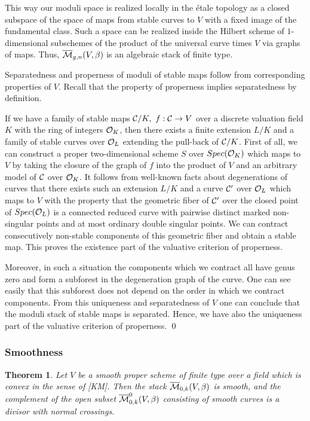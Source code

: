 \documentclass{amsart}
\newtheorem*{thm}{Theorem}
\begin{document}
This way our moduli space is realized locally in the \'etale topology as a
closed subspace of  the space of maps from stable curves to $V$ with a fixed
image of the fundamental class. Such a space can be realized inside the Hilbert
scheme of $1$-dimensional subschemes  of the product of the universal curve
times $V$ via  graphs of maps.
 Thus,   $\overline{\mathcal{M}}_{g,n}(V,\beta)$ is an algebraic stack of finite type.



Separatedness and properness of moduli of stable maps follow from
corresponding properties of $V$. Recall that the property of properness implies
separatedness by definition.

 If we have a family of stable maps  $\mathcal C/K,\,\,f:\mathcal C\to V$ over a
discrete valuation field $K$ with the ring of integers $\mathcal O_K$, then there
exists a finite extension $L/K$ and a family of stable curves over $\mathcal O_L$
extending the pull-back of $\mathcal C/K$. First of all, we can construct a proper
two-dimensional scheme $S$ over $Spec (\mathcal O_K)$ which maps to  $V$ by taking
the closure of the graph of $f$ into the product of $V$ and an arbitrary model
of $\mathcal C$ over $\mathcal O_K$. It follows from well-known facts about
degenerations of curves that there exists such an extension $L/K$ and a curve
$\mathcal C'$ over $\mathcal O_L$ which maps to $V$ with the property that the
geometric fiber of $\mathcal C'$ over the closed point of $Spec(\mathcal O_L)$ is a
connected reduced curve with pairwise distinct marked non-singular points and
at most ordinary double singular points. We can contract consecutively
non-stable components of this geometric fiber and obtain a stable map. This
proves the  existence part of the valuative criterion of properness.

  Moreover, in such a situation the components which we contract  all have
genus zero and form a subforest in the degeneration graph of the curve. One can
see easily that this subforest does not depend on the order in which we
contract components. From this uniqueness and separatedness of $V$ one can
conclude that the moduli stack of stable maps is separated. Hence, we have also
the uniqueness part of the valuative criterion of properness. \qed



\subsubsection{Smoothness}

\begin{thm} Let $V$ be a smooth proper scheme of finite type over a
field which is convex in the sense of [KM]. Then the stack
$\overline{\mathcal{M}}_{0,k}(V,\beta)$ is smooth, and the complement of the open subset
$\overline{\mathcal{M}}_{0,k}^0(V,\beta)$ consisting of smooth curves is a divisor with normal
crossings.\end{thm}
\end{document}
